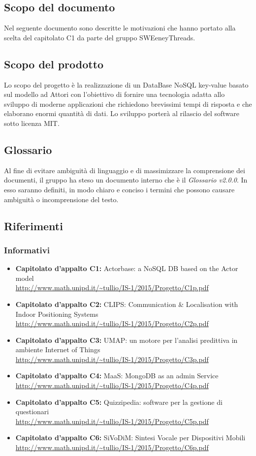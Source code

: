 \documentclass[a4paper]{article}
\begin{document}
	\subsection{Scopo del documento}
		Nel seguente documento sono descritte le motivazioni che hanno portato alla scelta del 
		capitolato C1 da parte del gruppo SWEeneyThreads. 
	\subsection{Scopo del prodotto}
		Lo scopo del progetto è la realizzazione di un DataBase NoSQL key-value basato sul modello ad 
		Attori con l'obiettivo di fornire una tecnologia adatta allo sviluppo di moderne 
		applicazioni che richiedono brevissimi tempi di risposta e che elaborano enormi quantità 
		di dati. Lo sviluppo porterà al rilascio del software sotto licenza MIT.
	\subsection{Glossario}
		Al fine di evitare ambiguità di linguaggio e di massimizzare la comprensione dei documenti, il 
      gruppo ha steso un documento interno che è il \emph{Glossario v2.0.0}. In esso saranno definiti, in modo
      chiaro e conciso i termini che possono causare ambiguità o incomprensione del testo.
	\subsection{Riferimenti}
	\subsubsection{Informativi}	
		\begin{itemize}
			\item \textbf{Capitolato d'appalto C1:} Actorbase: a NoSQL DB based on the Actor model \\
			\url{http://www.math.unipd.it/~tullio/IS-1/2015/Progetto/C1p.pdf}
			\item \textbf{Capitolato d'appalto C2:} CLIPS: Communication \& Localisation with Indoor
			 Positioning Systems \\
			\url{http://www.math.unipd.it/~tullio/IS-1/2015/Progetto/C2p.pdf}
			\item \textbf{Capitolato d'appalto C3:} UMAP: un motore per l'analisi predittiva in ambiente
			 Internet of Things \\
			\url{http://www.math.unipd.it/~tullio/IS-1/2015/Progetto/C3p.pdf}
			\item \textbf{Capitolato d'appalto C4:} MaaS: MongoDB as an admin Service \\
			\url{http://www.math.unipd.it/~tullio/IS-1/2015/Progetto/C4p.pdf}
			\item \textbf{Capitolato d'appalto C5:} Quizzipedia: software per la gestione di questionari \\
			\url{http://www.math.unipd.it/~tullio/IS-1/2015/Progetto/C5p.pdf}
			\item \textbf{Capitolato d'appalto C6:} SiVoDiM: Sintesi Vocale per Dispositivi Mobili \\
			\url{http://www.math.unipd.it/~tullio/IS-1/2015/Progetto/C6p.pdf}
		\end{itemize}
\end{document}
